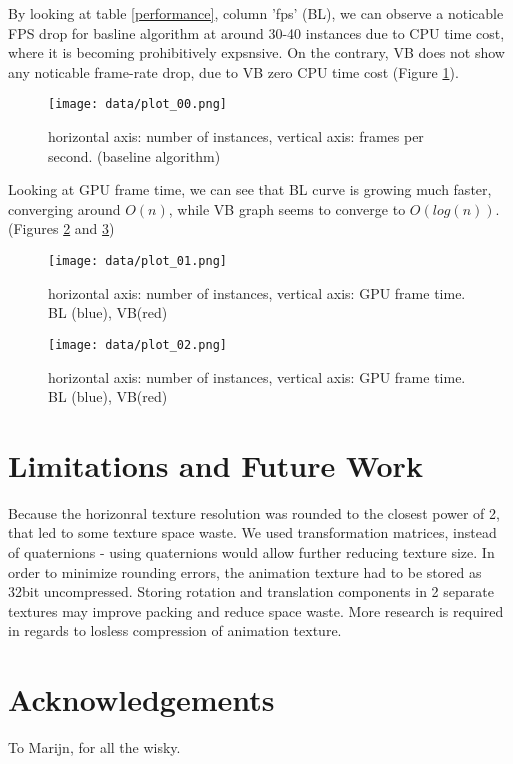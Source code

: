 \documentclass{acmsiggraph}
\begin{document}
By looking at  table \ref{performance}, column 'fps' (BL), we can observe a noticable FPS drop for basline algorithm at around 30-40 instances due to CPU time cost, where it is becoming prohibitively expsnsive.  On the contrary, VB does not show any noticable frame-rate drop, due to VB zero CPU time cost (Figure \ref{framerate_drop}).

\begin{figure}[H]
  \centering
  \texttt{[image: data/plot\_00.png]}
  \caption{horizontal axis: number of instances, vertical axis: frames per second. (baseline algorithm)}
  \label{framerate_drop}
\end{figure}

Looking at GPU frame time, we can see that BL curve is growing much faster, converging around \(O(n)\), while VB graph seems to converge to \(O(log (n))\). (Figures \ref{graph_growth} and \ref{graph_growth_1200})

\begin{figure}[H]
  \centering
  \texttt{[image: data/plot\_01.png]}
  \caption{horizontal axis: number of instances, vertical axis: GPU frame time. BL (blue), VB(red)}
  \label{graph_growth}
\end{figure}

\begin{figure}[ht]
  \centering
  \texttt{[image: data/plot\_02.png]}
  \caption{horizontal axis: number of instances, vertical axis: GPU frame time. BL (blue), VB(red)}
  \label{graph_growth_1200}
\end{figure}

\section{Limitations and Future Work}

Because the horizonral texture resolution was rounded to the closest power of 2, that led to some texture space waste.  We used transformation matrices, instead of quaternions - using quaternions would allow further reducing texture size.  In order to minimize rounding errors, the animation texture had to be stored as 32bit uncompressed. Storing rotation and translation components in 2 separate textures may improve packing and reduce space waste. More research is required in regards to losless compression of animation texture.

\section*{Acknowledgements}

To Marijn, for all the wisky.


\nocite{*}

\end{document}
